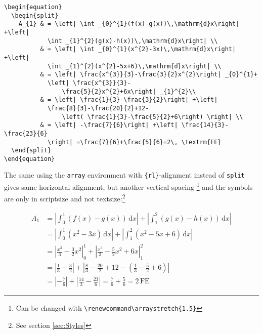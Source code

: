 \begin{table}[htb]
\begin{lstlisting}[xleftmargin=-1cm,xrightmargin=-1.5cm]
\begin{equation}
  \begin{split}
    A_{1} & = \left| \int _{0}^{1}(f(x)-g(x))\,\mathrm{d}x\right| +\left|
			\int _{1}^{2}(g(x)-h(x))\,\mathrm{d}x\right| \\
          & = \left| \int _{0}^{1}(x^{2}-3x)\,\mathrm{d}x\right| +\left|
			\int _{1}^{2}(x^{2}-5x+6)\,\mathrm{d}x\right| \\
          & = \left| \frac{x^{3}}{3}-\frac{3}{2}x^{2}\right| _{0}^{1}+
			\left| \frac{x^{3}}{3}-
                \frac{5}{2}x^{2}+6x\right| _{1}^{2}\\
          & = \left| \frac{1}{3}-\frac{3}{2}\right| +\left|
			\frac{8}{3}-\frac{20}{2}+12-
                \left( \frac{1}{3}-\frac{5}{2}+6\right) \right| \\
          & = \left| -\frac{7}{6}\right| +\left| \frac{14}{3}-\frac{23}{6}
			\right| =\frac{7}{6}+\frac{5}{6}=2\, \textrm{FE}
  \end{split}
\end{equation}
\end{lstlisting}

\bigskip{}
The same using the \verb|array| environment with \verb|{rl}|-alignment
instead of \verb|split| gives same horizontal alignment, but another    %
vertical spacing%
\footnote{Can be changed with \texttt{\textbackslash renewcommand\textbackslash arraystretch\{1.5\}}} and the
symbols are only in scriptsize and not textsize:\footnote{See section \vref{sec:Styles}}    %

\begin{equation}
\begin{array}{rl}
A_{1} & =\left|\int_{0}^{1}(f(x)-g(x))\,\mathrm{d}x\right|+\left|\int_{1}^{2}(g(x)-h(x))\,\mathrm{d}x\right|\\
 & =\left|\int_{0}^{1}(x^{2}-3x)\,\mathrm{d}x\right|+\left|\int_{1}^{2}(x^{2}-5x+6)\,\mathrm{d}x\right|\\
 & =\left|\frac{x^{3}}{3}-\frac{3}{2}x^{2}\right|_{0}^{1}+\left|\frac{x^{3}}{3}-\frac{5}{2}x^{2}+6x\right|_{1}^{2}\\
 & =\left|\frac{1}{3}-\frac{3}{2}\right|+\left|\frac{8}{3}-\frac{20}{2}+12-\left(\frac{1}{3}-\frac{5}{2}+6\right)\right|\\
 & =\left|-\frac{7}{6}\right|+\left|\frac{14}{3}-\frac{23}{6}\right|=\frac{7}{6}+\frac{5}{6}=2\,\textrm{FE}
 \end{array}
 \end{equation}


\end{table}

